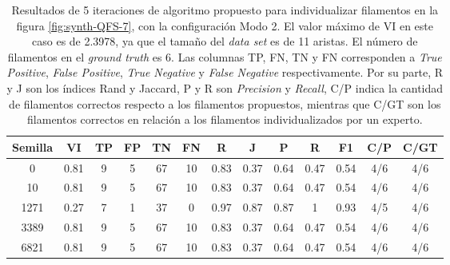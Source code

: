 \begin{table}[h]
    \centering
    \begin{tabular}{|c|c|c|c|c|c|c|c|c|c|c|c|c|}
    \hline
        Semilla & VI & TP & FP &TN &FN & R	& J & P & R &F1 & C/P & C/GT \\ \hline 
        0    & 0.81 & 9 & 5 & 67 & 10 & 0.83 & 0.37 & 0.64 & 0.47 & 0.54 & 4/6 & 4/6\\
        10 & 0.81 & 9 & 5 & 67 & 10 & 0.83 & 0.37 & 0.64 & 0.47 & 0.54 & 4/6 & 4/6\\
        1271 & 0.27 & 7 & 1 & 37  & 0  & 0.97 & 0.87 & 0.87 & 1 & 0.93 & 4/5 & 4/6\\
        3389 & 0.81 & 9 & 5 & 67 & 10 & 0.83 & 0.37 & 0.64 & 0.47 & 0.54 & 4/6 & 4/6\\
        6821 & 0.81 & 9 & 5 & 67 & 10 & 0.83 & 0.37 & 0.64 & 0.47 & 0.54 & 4/6 & 4/6\\
        \hline
    \end{tabular}
    \caption[Resultados de 5 iteraciones de algoritmo propuesto para individualizar filamentos en la figura \ref{fig:synth-QFS-7}, con la configuraci\'on Modo 2.]{Resultados de 5 iteraciones de algoritmo propuesto para individualizar filamentos en la figura \ref{fig:synth-QFS-7}, con la configuraci\'on Modo 2. El valor m\'aximo de VI en este caso es de 2.3978, ya que el tama\~no del {\it data set} es de 11 aristas. El n\'umero de filamentos en el {\it ground truth} es 6. Las columnas TP, FN, TN y FN corresponden a {\it True Positive}, {\it  False Positive}, {\it True Negative} y {\it False Negative} respectivamente. Por su parte, R y J son los \'indices Rand y Jaccard, P y R son {\it Precision} y {\it Recall}, C/P indica la cantidad de filamentos correctos respecto a los filamentos propuestos, mientras que C/GT son los filamentos correctos en relaci\'on a los filamentos individualizados por un experto.}
    \label{tab:Synth-QuantitativeIFS-Fig7DetailedResults1}
\end{table}


